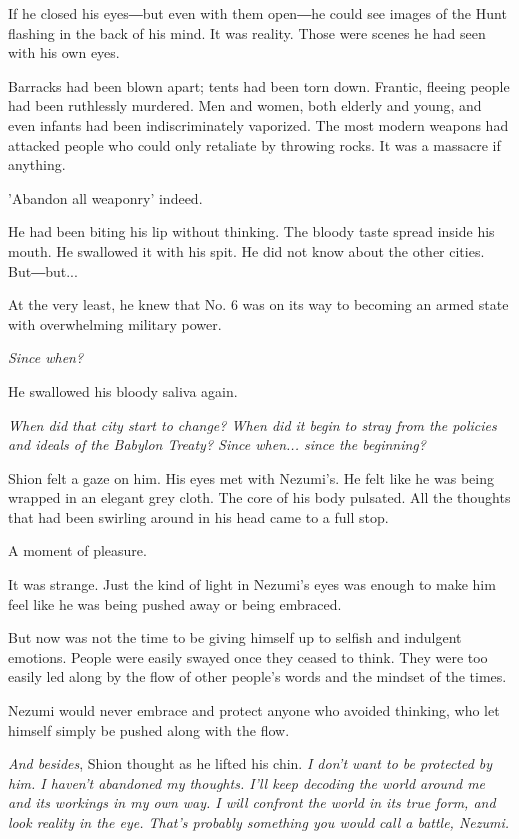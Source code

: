If he closed his eyes―but even with them open―he could see images of the
Hunt flashing in the back of his mind. It was reality. Those were scenes
he had seen with his own eyes.

Barracks had been blown apart; tents had been torn down. Frantic,
fleeing people had been ruthlessly murdered. Men and women, both elderly
and young, and even infants had been indiscriminately vaporized. The
most modern weapons had attacked people who could only retaliate by
throwing rocks. It was a massacre if anything.

'Abandon all weaponry' indeed.

He had been biting his lip without thinking. The bloody taste spread
inside his mouth. He swallowed it with his spit. He did not know about
the other cities. But―but...

At the very least, he knew that No. 6 was on its way to becoming an
armed state with overwhelming military power.

\emph{Since when?}

He swallowed his bloody saliva again.

\emph{When did that city start to change? When did it begin to stray
	from the policies and ideals of the Babylon Treaty? Since when... since
	the beginning?}

\mybreak

Shion felt a gaze on him. His eyes met with Nezumi's. He felt like he
was being wrapped in an elegant grey cloth. The core of his body
pulsated. All the thoughts that had been swirling around in his head
came to a full stop.

A moment of pleasure.

It was strange. Just the kind of light in Nezumi's eyes was enough to
make him feel like he was being pushed away or being embraced.

But now was not the time to be giving himself up to selfish and
indulgent emotions. People were easily swayed once they ceased to think.
They were too easily led along by the flow of other people's words and
the mindset of the times.

Nezumi would never embrace and protect anyone who avoided thinking, who
let himself simply be pushed along with the flow.

\emph{And besides}, Shion thought as he lifted his chin. \emph{I don't want to be
	protected by him. I haven't abandoned my thoughts. I'll keep decoding
	the world around me and its workings in my own way. I will confront the
	world in its true form, and look reality in the eye. That's probably
	something you would call a battle, Nezumi.}

